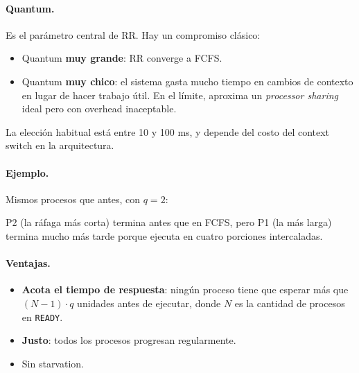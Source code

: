\documentclass[11pt,a4paper]{article}
\begin{document}
\paragraph{Quantum.} Es el parámetro central de RR. Hay un compromiso
clásico:
\begin{itemize}[leftmargin=*,nosep]
    \item Quantum \textbf{muy grande}: RR converge a FCFS.
    \item Quantum \textbf{muy chico}: el sistema gasta mucho tiempo en
        cambios de contexto en lugar de hacer trabajo útil. En el
        límite, aproxima un \emph{processor sharing} ideal pero con
        overhead inaceptable.
\end{itemize}
La elección habitual está entre 10 y 100 ms, y depende del costo del
context switch en la arquitectura.

\paragraph{Ejemplo.} Mismos procesos que antes, con $q = 2$:

\begin{center}
\end{center}

P2 (la ráfaga más corta) termina antes que en FCFS, pero P1 (la más
larga) termina mucho más tarde porque ejecuta en cuatro porciones
intercaladas.

\paragraph{Ventajas.}
\begin{itemize}[leftmargin=*,nosep]
    \item \textbf{Acota el tiempo de respuesta}: ningún proceso tiene
        que esperar más que $(N-1) \cdot q$ unidades antes de
        ejecutar, donde $N$ es la cantidad de procesos en
        \texttt{READY}.
    \item \textbf{Justo}: todos los procesos progresan
        regularmente.
    \item Sin starvation.
\end{itemize}
\end{document}
